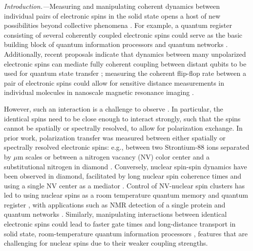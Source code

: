 \documentclass[%
 reprint,
 amsmath,amssymb,
 aps,
]{revtex4-1}
\begin{document}
\maketitle
\textit{Introduction.---}Measuring and manipulating coherent dynamics between individual pairs of electronic spins in the solid state opens a host of new possibilities beyond collective phenomena \cite{schweiger, spectral diffusion, silicon,joonhee,lukin mbl}. For example, a quantum register consisting of several coherently coupled electronic spins could serve as the basic building block of quantum information processors and quantum networks \cite{wrachtrup qm register, paola nuc spin register, wrachtrup nuc spin register}. Additionally, recent proposals indicate that dynamics between many unpolarized electronic spins can mediate fully coherent coupling between distant qubits to be used for quantum state transfer \cite{norm, ashok qst, gualdi, paola NMR}; measuring the coherent flip-flop rate between a pair of electronic spins could allow for sensitive distance measurements in individual molecules in nanoscale magnetic resonance imaging \cite{blank spin diffusion,blank flip flop}. 

However, such an interaction is a challenge to observe \cite{blank flip flop, blank spin diffusion}. In particular, the identical spins need to be close enough to interact strongly, such that the spins cannot be spatially or spectrally resolved, to allow for polarization exchange. In prior work, polarization transfer was measured between either spatially or spectrally resolved electronic spins: e.g., between two Strontium-88 ions separated by $\mu$m scales \cite{nature 2014 ions} or between a nitrogen vacancy (NV) color center and a substitutional nitrogen in diamond \cite{wrachtrup p1, awschalom p1, helena, chinmay}. Conversely, nuclear spin-spin dynamics have been observed in diamond, facilitated by long nuclear spin coherence times and using a single NV center as a mediator \cite{lily, gurudev,rep readout}. Control of NV-nuclear spin clusters has led to using nuclear spins as a room temperature quantum memory and quantum register \cite{rep readout, taminau, kalb natcomm, abobeih arxiv}, with applications such as NMR detection of a single protein \cite{igor} and quantum networks \cite{delft,taminau}. Similarly, manipulating interactions between identical electronic spins could lead to faster gate times and long-distance transport in solid state, room-temperature quantum information processors \cite{norm}, features that are challenging for nuclear spins due to their weaker coupling strengths.
\end{document}
